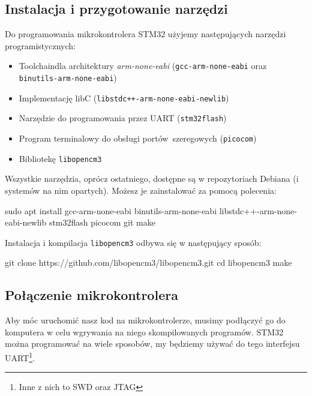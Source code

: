 \documentclass{pdfBooklets}
\begin{document}
\subsection{Instalacja i przygotowanie narzędzi}

Do programowania mikrokontrolera STM32 użyjemy następujących narzędzi programistycznych:

\begin{itemize}
\item Toolchain\footnotemark  dla architektury \emph{arm-none-eabi} (\Verb$gcc-arm-none-eabi$ oraz \Verb$binutils-arm-none-eabi$)
\item Implementację libC (\Verb$libstdc++-arm-none-eabi-newlib$)
\item Narzędzie do programowania przez UART (\Verb$stm32flash$)
\item Program terminalowy do obsługi portów~szeregowych (\Verb$picocom$)
\item Bibliotekę \Verb$libopencm3$
\end{itemize}
Wszystkie narzędzia, oprócz ostatniego, dostępne są w repozytoriach Debiana (i systemów na nim opartych). Możesz je zainstalować
za pomocą polecenia:

\begin{CodeFrame*}[bash]{}
sudo apt install gcc-arm-none-eabi binutils-arm-none-eabi libstdc++-arm-none-eabi-newlib stm32flash picocom git make
\end{CodeFrame*}

Instalacja i kompilacja \Verb$libopencm3$ odbywa się w następujący sposób:

\begin{CodeFrame*}[bash]{}
git clone https://github.com/libopencm3/libopencm3.git
cd libopencm3
make
\end{CodeFrame*}

\subsection{Połączenie mikrokontrolera}
Aby móc uruchomić nasz kod na mikrokontrolerze, musimy podłączyć go do komputera w celu wgrywania na niego skompilowanych programów.
STM32 można programować na wiele sposobów, my będziemy używać do tego interfejsu UART\footnote{Inne z nich to SWD oraz JTAG}.\\
\end{document}
